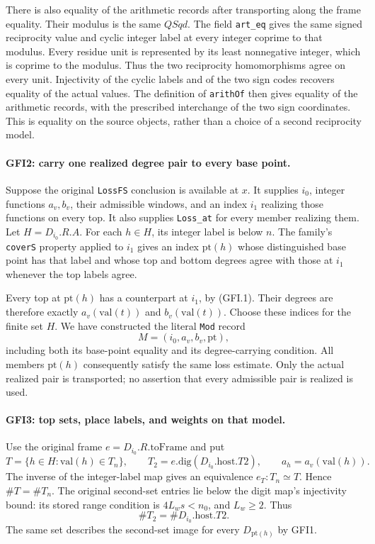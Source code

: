 There is also equality of the arithmetic records after transporting
along the frame equality.  Their modulus is the same $QSqd$.
The field \texttt{art\_eq} gives the same signed reciprocity value
and cyclic integer label at every integer coprime to that modulus.
Every residue unit is represented by its least nonnegative integer,
which is coprime to the modulus.  Thus the two reciprocity
homomorphisms agree on every unit.  Injectivity of the cyclic labels
and of the two sign codes recovers equality of the actual values.
The definition of \texttt{arithOf} then gives equality of the
arithmetic records, with the prescribed interchange of the two sign
coordinates.  This is equality on the source objects, rather than a
choice of a second reciprocity model.

\paragraph{GFI2: carry one realized degree pair to every base point.}
\label{claim:GFI2}
Suppose the original \texttt{LossFS} conclusion is available at $x$.
It supplies $i_0$, integer functions $a_v,b_v$, their admissible
windows, and an index $i_1$ realizing those functions on every top.
It also supplies \texttt{Loss\_at} for every member realizing them.
Let $H=D_{i_0}.R.A$.  For each $h\in H$, its integer label is below
$n$.  The family's \texttt{coverS} property applied to $i_1$ gives
an index $\mathrm{pt}(h)$ whose distinguished base point has that
label and whose top and bottom degrees agree with those at $i_1$
whenever the top labels agree.

Every top at $\mathrm{pt}(h)$ has a counterpart at $i_1$, by
(GFI.1).  Their degrees are therefore exactly
$a_v(\mathrm{val}(t))$ and $b_v(\mathrm{val}(t))$.  Choose these
indices for the finite set $H$.  We have constructed the literal
\texttt{Mod} record
\[
 M=(i_0,a_v,b_v,\mathrm{pt}),                            \tag{GFI.2}
\]
including both its base-point equality and its degree-carrying
condition.  All members $\mathrm{pt}(h)$ consequently satisfy the
same loss estimate.  Only the actual realized pair is transported;
no assertion that every admissible pair is realized is used.

\paragraph{GFI3: top sets, place labels, and weights on that model.}
\label{claim:GFI3}
Use the original frame $e=D_{i_0}.R.\mathrm{toFrame}$ and put
\[
 T=\{h\in H:\mathrm{val}(h)\in T_n\},\qquad
 T_2=e.\mathrm{dig}(D_{i_0}.\mathrm{host}.T2),\qquad
 a_h=a_v(\mathrm{val}(h)).                              \tag{GFI.3}
\]
The inverse of the integer-label map gives an equivalence
$e_T:T_n\simeq T$.  Hence $\#T=\#T_n$.  The original second-set
entries lie below the digit map's injectivity bound: its stored
range condition is $4L_w s<n_0$, and $L_w\ge2$.  Thus
\[
 \#T_2=\#D_{i_0}.\mathrm{host}.T2.                     \tag{GFI.4}
\]
The same set describes the second-set image for every $D_{\mathrm{pt}(h)}$
by GFI1.

